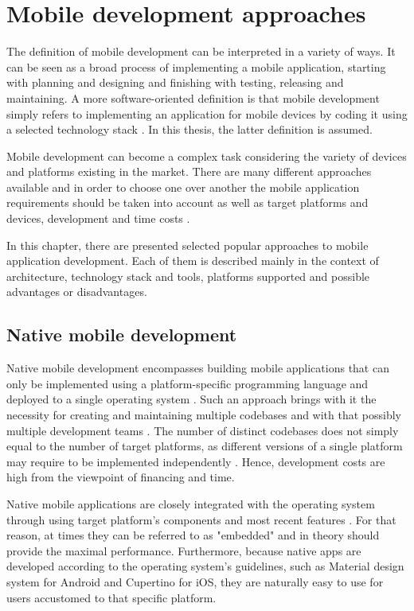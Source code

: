 
\section{Mobile development approaches}

The definition of mobile development can be interpreted in a variety of ways. It can be seen as a broad process of implementing a mobile application, starting with planning and designing and finishing with testing, releasing and maintaining. A more software-oriented definition is that mobile development simply refers to implementing an application for mobile devices by coding it using a selected technology stack \cite{microsoft_mobile_development}. In this thesis, the latter definition is assumed.

Mobile development can become a complex task considering the variety of devices and platforms existing in the market. There are many different approaches available and in order to choose one over another the mobile application requirements should be taken into account as well as target platforms and devices, development and time costs \cite{velvetech_mobile_dev_approaches}.

In this chapter, there are presented selected popular approaches to mobile application development. Each of them is described mainly in the context of architecture, technology stack and tools, platforms supported and possible advantages or disadvantages.

\subsection{Native mobile development}

Native mobile development encompasses building mobile applications that can only be implemented using a platform-specific programming language and deployed to a single operating system \cite{comparative_analysis_native_hybrid}. Such an approach brings with it the necessity for creating and maintaining multiple codebases and with that possibly multiple development teams \cite{approach_to_assess_performance_case_study}. The number of distinct codebases does not simply equal to the number of target platforms, as different versions of a single platform may require to be implemented independently \cite{appdynamics_mobile_app_performance}. Hence, development costs are high from the viewpoint of financing and time.

Native mobile applications are closely integrated with the operating system through using target platform's components \cite{comparison_perf_looks_flutter_native}\cite{comp_analysis_hybrid_frameworks} and most recent features \cite{eval_rn_flutter}. For that reason, at times they can be referred to as "embedded" 
 \cite{cross_platform_development_study_rn_flutter} and in theory should provide the maximal performance. Furthermore, because native apps are developed according to the operating system's guidelines, such as Material design system for Android and Cupertino for iOS, they are naturally easy to use for users accustomed to that specific platform.

